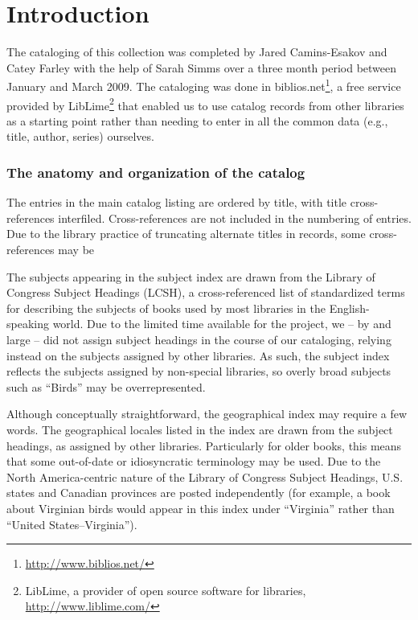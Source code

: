 \chapter*{Introduction}

The cataloging of this collection was completed by Jared Camins-Esakov and Catey
Farley with the help of Sarah Simms over a three month period between January
and March 2009. The cataloging was done in
{\ddag}biblios.net\footnote{\url{http://www.biblios.net/}}, a free service provided
by LibLime\footnote{LibLime, a provider of open source software for libraries,
\url{http://www.liblime.com/}} that enabled us to use catalog records from other
libraries as a starting point rather than needing to enter in all the common
data (e.g., title, author, series) ourselves.

\subsection*{The anatomy and organization of the catalog}

The entries in the main catalog listing are ordered by title, with title
cross-references interfiled. Cross-references are not included in the numbering
of entries. Due to the library practice of truncating alternate titles in records,
some cross-references may be

The subjects appearing in the subject index are drawn from the Library of
Congress Subject Headings (LCSH), a cross-referenced list of standardized terms
for describing the subjects of books used by most libraries in the
English-speaking world. Due to the limited time available for the project,
we -- by and large -- did not assign subject headings in the course of our
cataloging, relying instead on the subjects assigned by other libraries. As
such, the subject index reflects the subjects assigned by non-special libraries,
so overly broad subjects such as ``Birds'' may be overrepresented.

Although conceptually straightforward, the geographical index may require a few
words. The geographical locales listed in the index are drawn from the subject
headings, as assigned by other libraries. Particularly for older books, this
means that some out-of-date or idiosyncratic terminology may be used. Due to the
North America-centric nature of the Library of Congress Subject Headings, U.S.
states and Canadian provinces are posted independently (for example, a book about
Virginian birds would appear in this index under ``Virginia'' rather than ``United
States--Virginia'').

